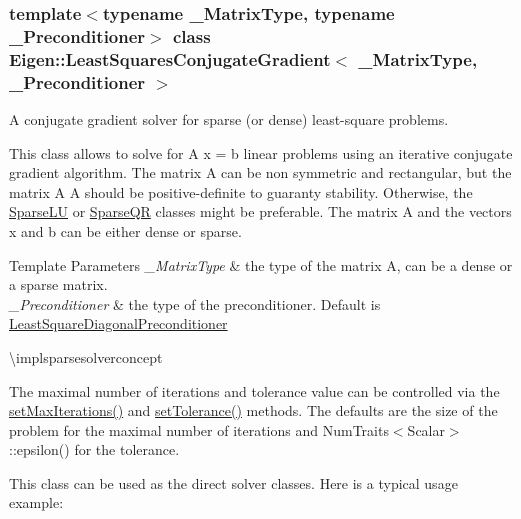 \subsubsection*{template$<$typename \+\_\+\+Matrix\+Type, typename \+\_\+\+Preconditioner$>$\newline
class Eigen\+::\+Least\+Squares\+Conjugate\+Gradient$<$ \+\_\+\+Matrix\+Type, \+\_\+\+Preconditioner $>$}

A conjugate gradient solver for sparse (or dense) least-\/square problems. 

This class allows to solve for A x = b linear problems using an iterative conjugate gradient algorithm. The matrix A can be non symmetric and rectangular, but the matrix A\textquotesingle{} A should be positive-\/definite to guaranty stability. Otherwise, the \mbox{\hyperlink{class_eigen_1_1_sparse_l_u}{Sparse\+LU}} or \mbox{\hyperlink{class_eigen_1_1_sparse_q_r}{Sparse\+QR}} classes might be preferable. The matrix A and the vectors x and b can be either dense or sparse.


\begin{DoxyTemplParams}{Template Parameters}
{\em \+\_\+\+Matrix\+Type} & the type of the matrix A, can be a dense or a sparse matrix. \\
\hline
{\em \+\_\+\+Preconditioner} & the type of the preconditioner. Default is \mbox{\hyperlink{class_eigen_1_1_least_square_diagonal_preconditioner}{Least\+Square\+Diagonal\+Preconditioner}}\\
\hline
\end{DoxyTemplParams}
\textbackslash{}implsparsesolverconcept

The maximal number of iterations and tolerance value can be controlled via the \mbox{\hyperlink{class_eigen_1_1_iterative_solver_base_af83de7a7d31d9d4bd1fef6222b07335b}{set\+Max\+Iterations()}} and \mbox{\hyperlink{class_eigen_1_1_iterative_solver_base_ac160a444af8998f93da9aa30e858470d}{set\+Tolerance()}} methods. The defaults are the size of the problem for the maximal number of iterations and Num\+Traits$<$\+Scalar$>$\+::epsilon() for the tolerance.

This class can be used as the direct solver classes. Here is a typical usage example\+: 
\begin{DoxyCode}{0}
\DoxyCodeLine{\textcolor{comment}{// fill A and b}}
\DoxyCodeLine{\textcolor{comment}{// update b, and solve again}}
\end{DoxyCode}


